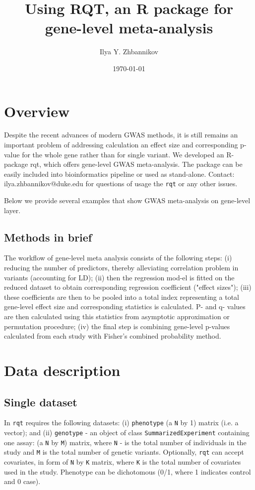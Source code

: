 \documentclass{article}
\title{Using RQT, an R package for gene-level meta-analysis}
\author{Ilya Y. Zhbannikov}
\date{\today}
\begin{document}

\maketitle

\section{Overview}

Despite the recent advances of modern GWAS methods, 
it is still remains an important problem of addressing 
calculation an effect size and corresponding p-value 
for the whole gene rather than for single variant. 
We developed an R-package rqt, which offers gene-level GWAS meta-analysis. 
The package can be easily included into bioinformatics pipeline 
or used as stand-alone. 
Contact: ilya.zhbannikov@duke.edu for questions of 
usage the \texttt{rqt} or any other issues.

Below we provide several examples that show GWAS 
meta-analysis on gene-level layer.

\subsection{Methods in brief}

The workflow of gene-level meta analysis consists of the following steps: 
(i) reducing the number of predictors, thereby alleviating 
correlation problem in variants (accounting for LD); 
(ii) then the regression mod-el is fitted on the reduced dataset 
to obtain corresponding regression coefficient ("effect sizes"); 
(iii) these coefficients are then to be pooled into a total index 
representing a total gene-level effect size and corresponding 
statistics is calculated. P- and q- values are then calculated 
using this statistics from asymptotic approximation or permutation 
procedure; (iv) the final step is combining gene-level p-values 
calculated from each study with Fisher's combined probability method.

\section{Data description}
\subsection{Single dataset}
In \texttt{rqt} requires the following datasets: 
(i) \texttt{phenotype} (a \texttt{N} by 1) matrix (i.e. a vector); 
and (ii) \texttt{genotype} - an object of class 
\texttt{SummarizedExperiment} containing one assay:
(a \texttt{N} by \texttt{M}) matrix, where 
\texttt{N} - is the total 
number of individuals in the study and \texttt{M} is the total number 
of genetic variants. Optionally, \texttt{rqt} can accept covariates, 
in form of \texttt{N} by \texttt{K} matrix, where \texttt{K} 
is the total number of 
covariates used in the study. Phenotype can be dichotomous 
(0/1, where 1 indicates control and 0 case).
\end{document}
